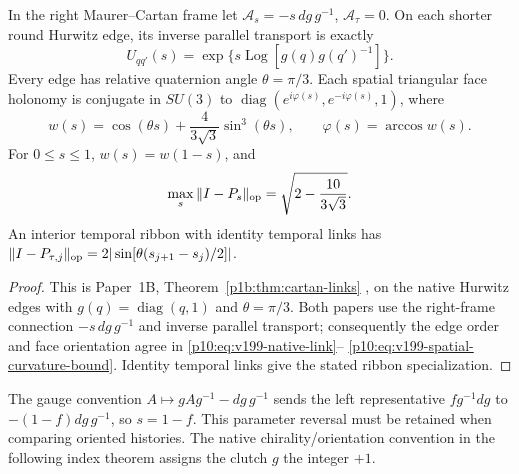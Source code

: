 \documentclass[12pt,a4paper]{article}
\begin{document}
\begin{theorem}
\label{p10:thm:v199-exact-cartan-links}
In the right Maurer--Cartan frame let
\(\mathscr A_s=-s\,dg\,g^{-1}\), \(\mathscr A_\tau=0\).
On each shorter round Hurwitz edge, its inverse parallel transport is exactly
\begin{equation}
 U_{qq'}(s)=\exp\{s\operatorname{Log}[g(q)g(q')^{-1}]\}.
 \label{p10:eq:v199-native-link}
\end{equation}
Every edge has relative quaternion angle \(\theta=\pi/3\).  Each spatial
triangular face holonomy is conjugate in \(SU(3)\) to
\(\operatorname{diag}(e^{i\varphi(s)},e^{-i\varphi(s)},1)\), where
\begin{equation}
 w(s)=\cos(\theta s)+\frac4{3\sqrt3}\sin^3(\theta s),\qquad
 \varphi(s)=\arccos w(s).
 \label{p10:eq:v199-face-holonomy}
\end{equation}
For \(0\le s\le1\), \(w(s)=w(1-s)\), and
\begin{equation}
 \max_s\|I-P_s\|_{\rm op}=\sqrt{2-\frac{10}{3\sqrt3}}.
 \label{p10:eq:v199-spatial-curvature-bound}
\end{equation}
An interior temporal ribbon with identity temporal links has
\(\|I-P_{\tau,j}\|_{\rm op}
=2|\sin[\theta(s_{j+1}-s_j)/2]|\).
\end{theorem}
\begin{proof}
This is Paper~1B, Theorem~\ref{p1b:thm:cartan-links}
\cite{Kugelmann2026Paper1B}, on the native Hurwitz edges with
$g(q)=\operatorname{diag}(q,1)$ and $\theta=\pi/3$.
Both papers use the right-frame connection $-s\,dg\,g^{-1}$ and
inverse parallel transport; consequently the edge order and face
orientation agree in \eqref{p10:eq:v199-native-link}--
\eqref{p10:eq:v199-spatial-curvature-bound}. Identity temporal links
give the stated ribbon specialization.
\end{proof}

The gauge convention \(A\mapsto gAg^{-1}-dg\,g^{-1}\) sends the left
representative \(f g^{-1}dg\) to \(-(1-f)dg\,g^{-1}\), so \(s=1-f\).
This parameter reversal must be retained when comparing oriented histories.
The native chirality/orientation convention in the following index theorem
assigns the clutch \(g\) the integer \(+1\).
\end{document}

